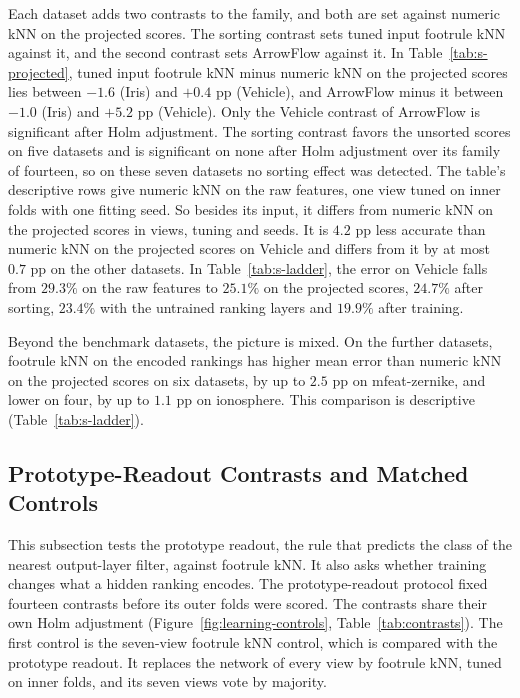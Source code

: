

Each dataset adds two contrasts to the family, and both are set against numeric kNN on the projected scores. The sorting contrast sets tuned input footrule kNN against it, and the second contrast sets ArrowFlow against it. In Table~\ref{tab:s-projected}, tuned input footrule kNN minus numeric kNN on the projected scores lies between $-1.6$ (Iris) and $+0.4$ pp (Vehicle), and ArrowFlow minus it between $-1.0$ (Iris) and $+5.2$ pp (Vehicle). Only the Vehicle contrast of ArrowFlow is significant after Holm adjustment. The sorting contrast favors the unsorted scores on five datasets and is significant on none after Holm adjustment over its family of fourteen, so on these seven datasets no sorting effect was detected. The table's descriptive rows give numeric kNN on the raw features, one view tuned on inner folds with one fitting seed. So besides its input, it differs from numeric kNN on the projected scores in views, tuning and seeds. It is $4.2$ pp less accurate than numeric kNN on the projected scores on Vehicle and differs from it by at most $0.7$ pp on the other datasets. In Table~\ref{tab:s-ladder}, the error on Vehicle falls from $29.3\%$ on the raw features to $25.1\%$ on the projected scores, $24.7\%$ after sorting, $23.4\%$ with the untrained ranking layers and $19.9\%$ after training.

Beyond the benchmark datasets, the picture is mixed. On the further datasets, footrule kNN on the encoded rankings has higher mean error than numeric kNN on the projected scores on six datasets, by up to $2.5$ pp on mfeat-zernike, and lower on four, by up to $1.1$ pp on ionosphere. This comparison is descriptive (Table~\ref{tab:s-ladder}).

\FloatBarrier
\subsection{Prototype-Readout Contrasts and Matched Controls}\label{supp:learning}

This subsection tests the prototype readout, the rule that predicts the class of the nearest output-layer filter, against footrule kNN. It also asks whether training changes what a hidden ranking encodes. The prototype-readout protocol fixed fourteen contrasts before its outer folds were scored. The contrasts share their own Holm adjustment (Figure~\ref{fig:learning-controls}, Table~\ref{tab:contrasts}). The first control is the seven-view footrule kNN control, which is compared with the prototype readout. It replaces the network of every view by footrule kNN, tuned on inner folds, and its seven views vote by majority.

